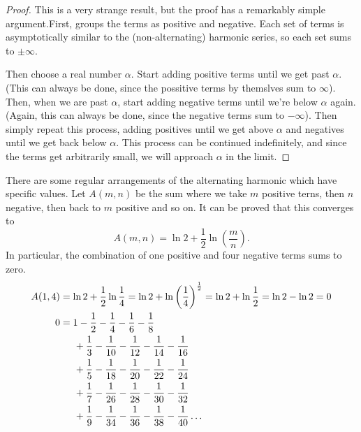 \documentclass[fleqn,letterpaper]{report}
\begin{document}
\begin{proof}
This is a very strange result, but the proof has a remarkably
simple argument.First, groups the terms as positive and
negative. Each set of terms is asymptotically similar to the
(non-alternating) harmonic series, so each set sums to $\pm
\infty$.

Then choose a real number $\alpha$.  Start adding positive
terms until we get past $\alpha$. (This can always be done,
since the possitive terms by themslves sum to $\infty$).
Then, when we are past $\alpha$, start adding negative terms
until we're below $\alpha$ again. (Again, this can always be
done, since the negative terms sum to $-\infty$). Then simply
repeat this process, adding positives until we get above
$\alpha$ and negatives until we get back below $\alpha$. This
process can be continued indefinitely, and since the terms get
arbitrarily small, we will approach $\alpha$ in the limit.
\end{proof}

\begin{example}
There are some regular arrangements of the alternating
harmonic which have specific values. Let $A(m,n)$ be the sum
where we take $m$ positive terns, then $n$ negative, then back
to $m$ positive and so on. It can be proved that this
converges to
\begin{equation*}
A(m,n) = \ln 2 + \frac{1}{2} \ln \left( \frac{m}{n} \right) .
\end{equation*}
In particular, the combination of one positive and four
negative terms sums to zero.
\begin{align*}
A(1,4) & = \ln 2 + \frac{1}{2} \ln \frac{1}{4} = \ln 2 + \ln
\left( \frac{1}{4} \right)^{\frac{1}{2}} = \ln 2 + \ln
\frac{1}{2} = \ln 2 - \ln 2 = 0 \\
0 & = 1 - \frac{1}{2} - \frac{1}{4} - \frac{1}{6} - \frac{1}{8} \\
& \hspace{0.5cm} + \frac{1}{3} - \frac{1}{10} - \frac{1}{12} -
\frac{1}{14} - \frac{1}{16} \\
& \hspace{0.5cm} + \frac{1}{5} - \frac{1}{18} - \frac{1}{20} -
\frac{1}{22} - \frac{1}{24} \\
& \hspace{0.5cm} + \frac{1}{7} - \frac{1}{26} - \frac{1}{28} -
\frac{1}{30} - \frac{1}{32} \\
& \hspace{0.5cm} + \frac{1}{9} - \frac{1}{34} - \frac{1}{36} -
\frac{1}{38} - \frac{1}{40} \ldots 
\end{align*}
\end{example}
\end{document}

